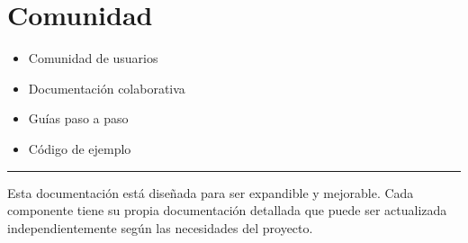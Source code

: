 \documentclass[a4paper,11pt,spanish]{sphinxmanual}
\begin{document}
\section{Comunidad}
\label{\detokenize{index:comunidad}}\begin{itemize}
\item {} 
\sphinxAtStartPar
{} Comunidad de usuarios

\item {} 
\sphinxAtStartPar
{} Documentación colaborativa

\item {} 
\sphinxAtStartPar
{} Guías paso a paso

\item {} 
\sphinxAtStartPar
{} Código de ejemplo

\end{itemize}


\bigskip\hrule\bigskip


\sphinxAtStartPar
{} Esta documentación está diseñada para ser expandible y mejorable. Cada componente tiene su propia documentación detallada que puede ser actualizada independientemente según las necesidades del proyecto.



\renewcommand{\indexname}{Índice}
\printindex
\end{document}
